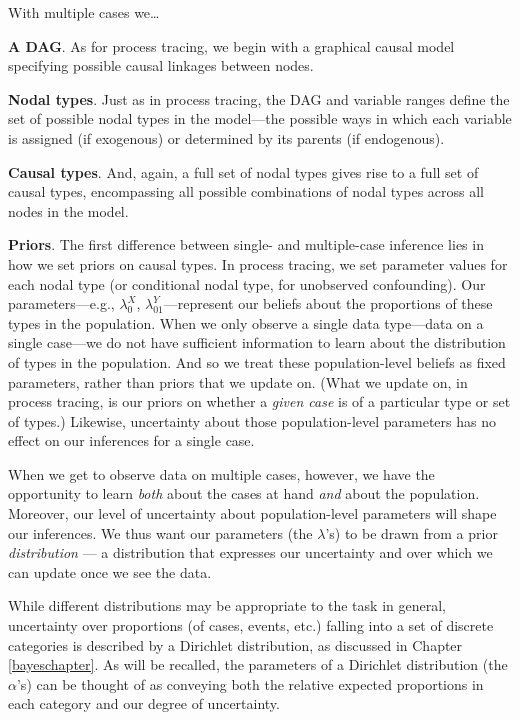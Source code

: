 \documentclass[12pt,]{book}
\begin{document}
With multiple cases we\ldots{}

\textbf{A DAG}. As for process tracing, we begin with a graphical causal model specifying possible causal linkages between nodes.

\textbf{Nodal types}. Just as in process tracing, the DAG and variable ranges define the set of possible nodal types in the model---the possible ways in which each variable is assigned (if exogenous) or determined by its parents (if endogenous).

\textbf{Causal types}. And, again, a full set of nodal types gives rise to a full set of causal types, encompassing all possible combinations of nodal types across all nodes in the model.

\textbf{Priors}. The first difference between single- and multiple-case inference lies in how we set priors on causal types. In process tracing, we set parameter values for each nodal type (or conditional nodal type, for unobserved confounding). Our parameters---e.g., \(\lambda^X_0\), \(\lambda^Y_{01}\)---represent our beliefs about the proportions of these types in the population. When we only observe a single data type---data on a single case---we do not have sufficient information to learn about the distribution of types in the population. And so we treat these population-level beliefs as fixed parameters, rather than priors that we update on. (What we update on, in process tracing, is our priors on whether a \emph{given case} is of a particular type or set of types.) Likewise, uncertainty about those population-level parameters has no effect on our inferences for a single case.

When we get to observe data on multiple cases, however, we have the opportunity to learn \emph{both} about the cases at hand \emph{and} about the population. Moreover, our level of uncertainty about population-level parameters will shape our inferences. We thus want our parameters (the \(\lambda\)'s) to be drawn from a prior \emph{distribution} --- a distribution that expresses our uncertainty and over which we can update once we see the data.

While different distributions may be appropriate to the task in general, uncertainty over proportions (of cases, events, etc.) falling into a set of discrete categories is described by a Dirichlet distribution, as discussed in Chapter \ref{bayeschapter}. As will be recalled, the parameters of a Dirichlet distribution (the \(\alpha\)'s) can be thought of as conveying both the relative expected proportions in each category and our degree of uncertainty.
\end{document}
